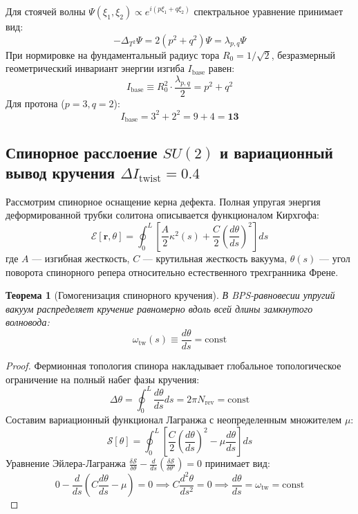 \documentclass[12pt,a4paper]{article}
\newtheorem{theorem}{Теорема}
\begin{document}
Для стоячей волны $\Psi(\xi_1, \xi_2) \propto e^{i(p\xi_1 + q\xi_2)}$ спектральное уравнение принимает вид:
\begin{equation}
	-\Delta_{T^2} \Psi = 2 \left( p^2 + q^2 \right) \Psi = \lambda_{p,q} \Psi
\end{equation}
При нормировке на фундаментальный радиус тора $R_0 = 1/\sqrt{2}$, безразмерный геометрический инвариант энергии изгиба $I_{\text{base}}$ равен:
\begin{equation}
	I_{\text{base}} \equiv R_0^2 \cdot \frac{\lambda_{p,q}}{2} = p^2 + q^2
\end{equation}
Для протона ($p=3, q=2$):
\begin{equation}
	I_{\text{base}} = 3^2 + 2^2 = 9 + 4 = \mathbf{13}
\end{equation}

\subsection{Спинорное расслоение $SU(2)$ и вариационный вывод кручения $\Delta I_{\text{twist}} = 0.4$}
Рассмотрим спинорное оснащение керна дефекта. Полная упругая энергия деформированной трубки солитона описывается функционалом Кирхгофа:
\begin{equation}
	\mathcal{E}[\mathbf{r}, \theta] = \oint_0^L \left[ \frac{A}{2} \kappa^2(s) + \frac{C}{2} \left( \frac{d\theta}{ds} \right)^2 \right] ds
\end{equation}
где $A$ — изгибная жесткость, $C$ — крутильная жесткость вакуума, $\theta(s)$ — угол поворота спинорного репера относительно естественного трехгранника Френе.

\begin{theorem}[Гомогенизация спинорного кручения]
	В BPS-равновесии упругий вакуум распределяет кручение равномерно вдоль всей длины замкнутого волновода:
	\begin{equation}
		\omega_{\mathrm{tw}}(s) \equiv \frac{d\theta}{ds} = \mathrm{const}
	\end{equation}
\end{theorem}

\begin{proof}
	Фермионная топология спинора накладывает глобальное топологическое ограничение на полный набег фазы кручения:
	\begin{equation}
		\Delta \theta = \oint_0^L \frac{d\theta}{ds} ds = 2\pi N_{\text{rev}} = \text{const}
	\end{equation}
	Составим вариационный функционал Лагранжа с неопределенным множителем $\mu$:
	\begin{equation}
		\mathcal{S}[\theta] = \oint_0^L \left[ \frac{C}{2} \left(\frac{d\theta}{ds}\right)^2 - \mu \frac{d\theta}{ds} \right] ds
	\end{equation}
	Уравнение Эйлера-Лагранжа $\frac{\delta \mathcal{S}}{\delta \theta} - \frac{d}{ds}\left(\frac{\delta \mathcal{S}}{\delta \theta'}\right) = 0$ принимает вид:
	\begin{equation}
		0 - \frac{d}{ds} \left( C \frac{d\theta}{ds} - \mu \right) = 0 \implies C \frac{d^2\theta}{ds^2} = 0 \implies \frac{d\theta}{ds} = \omega_{\text{tw}} = \text{const}
	\end{equation}
\end{proof}
\end{document}
